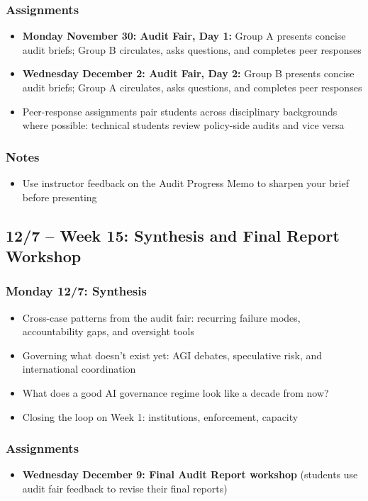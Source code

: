 \documentclass[12pt]{article}
\begin{document}
    \subsubsection*{Assignments}
        \begin{itemize}
            \item \textbf{Monday November 30: Audit Fair, Day 1:} Group A presents concise audit briefs; Group B circulates, asks questions, and completes peer responses
            \item \textbf{Wednesday December 2: Audit Fair, Day 2:} Group B presents concise audit briefs; Group A circulates, asks questions, and completes peer responses
            \item Peer-response assignments pair students across disciplinary backgrounds where possible: technical students review policy-side audits and vice versa
        \end{itemize}
    \subsubsection*{Notes}
        \begin{itemize}
            \item Use instructor feedback on the Audit Progress Memo to sharpen your brief before presenting
        \end{itemize}

\subsection*{12/7 -- Week 15: Synthesis and Final Report Workshop}
    \subsubsection*{Monday 12/7: Synthesis}
        \begin{itemize}
            \item Cross-case patterns from the audit fair: recurring failure modes, accountability gaps, and oversight tools
            \item Governing what doesn't exist yet: AGI debates, speculative risk, and international coordination
            \item What does a good AI governance regime look like a decade from now?
            \item Closing the loop on Week 1: institutions, enforcement, capacity
        \end{itemize}
    \subsubsection*{Assignments}
        \begin{itemize}
            \item \textbf{Wednesday December 9: Final Audit Report workshop} (students use audit fair feedback to revise their final reports)
        \end{itemize}
\end{document}
